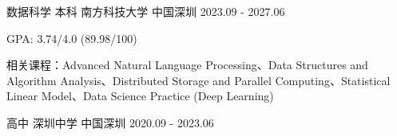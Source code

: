 

\begin{cventries}

  \cventry
    {数据科学 本科}
    {南方科技大学}
    {中国深圳}
    {2023.09 - 2027.06}
    {
      \begin{cvitems}
        \item {GPA: 3.74/4.0 (89.98/100)}
        \item {相关课程：Advanced Natural Language Processing、Data Structures and Algorithm Analysis、Distributed Storage and Parallel Computing、Statistical Linear Model、Data Science Practice (Deep Learning)}
      \end{cvitems}
    }

  \cventry
    {高中}
    {深圳中学}
    {中国深圳}
    {2020.09 - 2023.06}
    {
    }

\end{cventries}
